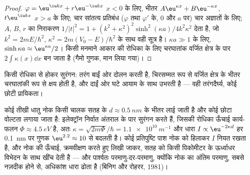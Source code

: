 \begin{proof}
$\varphi = \eu^{\iu kx} + r\eu^{-\iu kx}$ $x < 0$ के लिए, भीतर $A\eu^{\kappa x} + B\eu^{-\kappa x}$,
$t\eu^{\iu kx}$ $x > a$ के लिए; चार सांतत्य प्रतिबंध ($\varphi$
तथा $\varphi'$ के, $0$ और $a$ पर) चार अज्ञातों के लिए; $A$, $B$, $r$ का निराकरण
$1/|t|^2 = 1 + (k^2 + \kappa^2)^2\sinh^2(\kappa a)/4k^2\kappa^2$ देता है, जो
$k^2 = 2mE/\hbar^2$, $\kappa^2 = 2m(V_0 - E)/\hbar^2$ के साथ वही सूत्र है।
$\kappa a \gg 1$ के लिए, $\sinh\kappa a \approx \eu^{\kappa a}/2$। किसी मनमाने आकार की
रोधिका के लिए चरघातांक वर्जित क्षेत्र के पार
$2\int\kappa(x)\dd x$ बन जाता है (गैमो गुणक, मान लिया गया)।
\end{proof}

\begin{omfigure}

{\small किसी रोधिका से होकर सुरंगन: तरंग बाईं ओर दोलन करती है,
चिरसम्मत रूप से वर्जित क्षेत्र के भीतर चरघातांकी रूप से क्षय होती है, और
दाईं ओर घटे आयाम के साथ उभरती है --- वही तरंगदैर्घ्य,
कोई छोटी प्रायिकता।}
\end{omfigure}

\begin{example}\label{ex:b2:potential-wells-tunneling:stm}
कोई तीखी धातु नोक किसी चालक सतह के $d \approx \qty{0.5}{nm}$ के भीतर
लाई जाती है और कोई छोटा वोल्टता लगाया जाता है: इलेक्ट्रॉन
निर्वात अंतराल के पार सुरंगन करते हैं, जिसकी रोधिका ऊँचाई कार्य-फलन $\Phi \approx
\qty{4.5}{eV}$ है, अतः $\kappa = \sqrt{2m\Phi}/\hbar = \qty{1.1e10}{m^{-1}}$ और
धारा $I \propto \eu^{-2\kappa d}$ हर \qty{0.1}{nm} पर गुणक $\eu^{2.2} \approx
10$ से बदलती है। कोई प्रतिपुष्टि पाश नोक को हिलाकर $I$
नियत रखता है, और नोक की ऊँचाई, क्रमवीक्षण करते हुए लिखी जाकर, सतह को
किसी पिकोमीटर के ऊर्ध्वाधर विभेदन के साथ खींच देती है --- और पार्श्वतः परमाणु-दर-परमाणु,
क्योंकि नोक का अंतिम परमाणु, सबसे नज़दीक होने से, अधिकांश
धारा ढोता है (बिनिग और रोहरर, 1981)।
\end{example}

